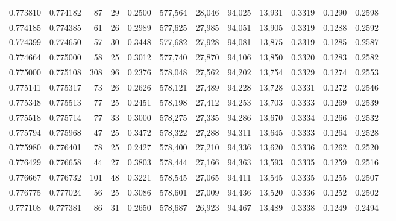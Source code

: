 \begin{tabular}{rrrrrrrrrrrrr}
0.773810 & 0.774182 &     87 &    29 &                                     0.2500 & 577,564 &  28,046 &  94,025 &  13,931 & 0.3319 & 0.1290 & 0.2598 \\
0.774185 & 0.774385 &     61 &    26 &                                     0.2989 & 577,625 &  27,985 &  94,051 &  13,905 & 0.3319 & 0.1288 & 0.2592 \\
0.774399 & 0.774650 &     57 &    30 &                                     0.3448 & 577,682 &  27,928 &  94,081 &  13,875 & 0.3319 & 0.1285 & 0.2587 \\
0.774664 & 0.775000 &     58 &    25 &                                     0.3012 & 577,740 &  27,870 &  94,106 &  13,850 & 0.3320 & 0.1283 & 0.2582 \\
0.775000 & 0.775108 &    308 &    96 &                                     0.2376 & 578,048 &  27,562 &  94,202 &  13,754 & 0.3329 & 0.1274 & 0.2553 \\
0.775141 & 0.775317 &     73 &    26 &                                     0.2626 & 578,121 &  27,489 &  94,228 &  13,728 & 0.3331 & 0.1272 & 0.2546 \\
0.775348 & 0.775513 &     77 &    25 &                                     0.2451 & 578,198 &  27,412 &  94,253 &  13,703 & 0.3333 & 0.1269 & 0.2539 \\
0.775518 & 0.775714 &     77 &    33 &                                     0.3000 & 578,275 &  27,335 &  94,286 &  13,670 & 0.3334 & 0.1266 & 0.2532 \\
0.775794 & 0.775968 &     47 &    25 &                                     0.3472 & 578,322 &  27,288 &  94,311 &  13,645 & 0.3333 & 0.1264 & 0.2528 \\
0.775980 & 0.776401 &     78 &    25 &                                     0.2427 & 578,400 &  27,210 &  94,336 &  13,620 & 0.3336 & 0.1262 & 0.2520 \\
0.776429 & 0.776658 &     44 &    27 &                                     0.3803 & 578,444 &  27,166 &  94,363 &  13,593 & 0.3335 & 0.1259 & 0.2516 \\
0.776667 & 0.776732 &    101 &    48 &                                     0.3221 & 578,545 &  27,065 &  94,411 &  13,545 & 0.3335 & 0.1255 & 0.2507 \\
0.776775 & 0.777024 &     56 &    25 &                                     0.3086 & 578,601 &  27,009 &  94,436 &  13,520 & 0.3336 & 0.1252 & 0.2502 \\
0.777108 & 0.777381 &     86 &    31 &                                     0.2650 & 578,687 &  26,923 &  94,467 &  13,489 & 0.3338 & 0.1249 & 0.2494 \\

\end{tabular}
